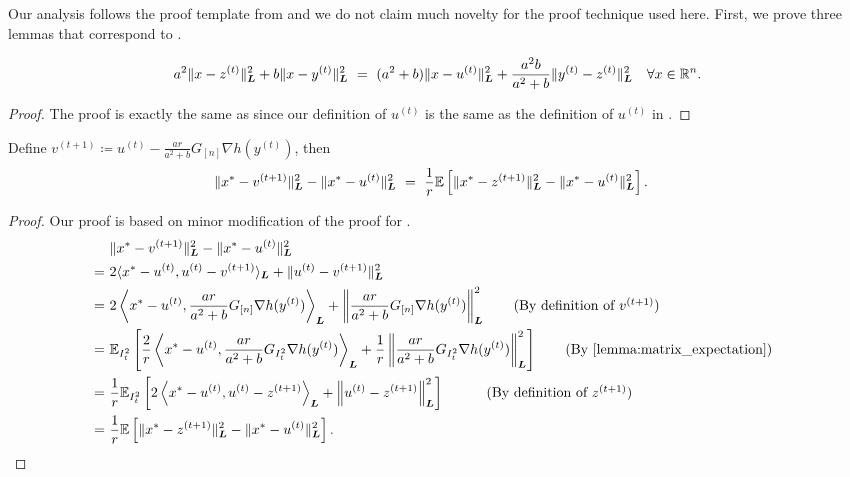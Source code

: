 Our analysis follows the proof template from \citet{Lu18} and we do not claim much novelty for the proof technique used here. First, we prove three lemmas that correspond to \citep[Lemma~A.1, Lemma~A.2, Lemma~A.3]{Lu18}.

\begin{lemma} \label{lemma:Lu18A1}
    \begin{align*}
        a^2 \| x - z^{(t)} \|^2_{\boldsymbol{L}} + b  \| x - y^{(t)} \|^2_{\boldsymbol{L}} ~=~ (a^2 + b) \| x - u^{(t)} \|^2_{\boldsymbol{L}} + \frac{a^2b}{a^2+b} \| y^{(t)} - z^{(t)} \|^2_{\boldsymbol{L}} \quad \forall x \in \mathbb{R}^n.
    \end{align*}
\end{lemma}
\begin{proof}
     The proof is exactly the same as \cite[Lemma~A.1]{Lu18} since our definition of $u^{(t)}$ is the same as the definition of $u^{(t)}$ in \cite[Algorithm~2]{Lu18}.
\end{proof}

\begin{lemma} \label{lemma:Lu18A2}
    Define $v^{(t+1)} \coloneqq u^{(t)} - \frac{ar}{a^2 + b} G_{[n]} \nabla h(y^{(t)})$, then
    \begin{align*}
        \| x^* - v^{(t+1)} \|^2_{\boldsymbol{L}} - \| x^* - u^{(t)} \|^2_{\boldsymbol{L}} &~=~ \frac{1}{r} \mathbb{E} \left[ \| x^* - z^{(t+1)} \|^2_{\boldsymbol{L}} - \| x^* - u^{(t)} \|^2_{\boldsymbol{L}} \right]. 
    \end{align*}
\end{lemma}

\begin{proof}
    Our proof is based on minor modification of the proof for \citealp[Lemma~A.2]{Lu18}.
    \begin{align*}
         &\| x^* - v^{(t+1)} \|^2_{\bL} - \| x^* - u^{(t)} \|^2_{\bL}  \\
         ~=~& 2 \langle x^* - u^{(t)}, u^{(t)} - v^{(t+1)} \rangle_{\bL} + \| u^{(t)} - v^{(t+1)} \|_{\bL}^2 \\
         ~=~& 2 \left\langle x^* - u^{(t)}, \frac{ar}{a^2 + b} G_{[n]} \nabla h(y^{(t)}) \right\rangle_{\bL} + \left\| \frac{ar}{a^2 + b} G_{[n]} \nabla h(y^{(t)}) \right\|_{\bL}^2 \quad \text{(By definition of $v^{(t+1)}$)} \\
       ~=~& \mE_{I_t^2}\left[ \frac{2}{r} \left\langle x^* - u^{(t)}, \frac{ar}{a^2 + b} G_{I_t^2} \nabla h(y^{(t)}) \right\rangle_{\bL } + \frac{1}{r} \left\| \frac{ar}{a^2 + b} G_{I_t^2} \nabla h(y^{(t)}) \right\|_{\bL}^2 \right] \quad \text{(By \autoref{lemma:matrix_expectation})} \\
       ~=~& \frac{1}{r} \mE_{I_t^2}\left[ 2 \left\langle x^* - u^{(t)}, u^{(t)} - z^{(t+1)} \right\rangle_{\bL } + \left\| u^{(t)} - z^{(t+1)} \right\|_{\bL}^2 \right] \qquad \text{(By definition of $z^{(t+1)}$)} \\
       ~=~& \frac{1}{r}  \mE \left[ \| x^* - z^{(t+1)} \|^2_{\bL} - \| x^* - u^{(t)} \|^2_{\bL} \right].
    \end{align*}
\end{proof}

